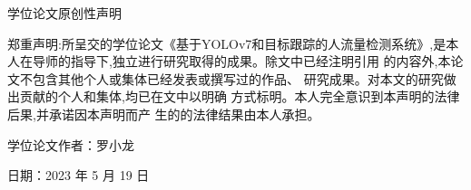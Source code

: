 \documentclass[UTF8,12pt, AutoFakeBold,fontset = founder]{ctexart}
\begin{document}
\begin{thebibliography}{00}
\end{thebibliography}
\endgroup


{
    
\newpage
{}
\thispagestyle{empty}
\begin{center}
     {\huge 学位论文原创性声明}
\end{center}

\vspace*{3\baselineskip}

\begin{spacing}{2}
郑重声明:所呈交的学位论文《基于YOLOv7和目标跟踪的人流量检测系统》,是本
人在导师的指导下,独立进行研究取得的成果。除文中已经注明引用
的内容外,本论文不包含其他个人或集体已经发表或撰写过的作品、
研究成果。对本文的研究做出贡献的个人和集体,均已在文中以明确
方式标明。本人完全意识到本声明的法律后果,并承诺因本声明而产
生的的法律结果由本人承担。
\end{spacing}

\vspace*{5\baselineskip}

 学位论文作者：罗小龙

\vspace*{2\baselineskip}

 日期：2023 年 5 月 19 日

}
\end{document}

